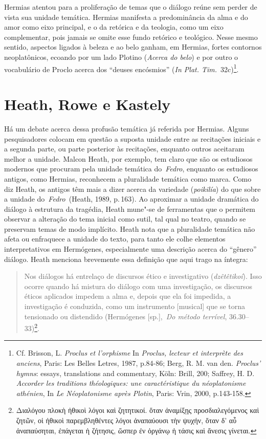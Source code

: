 Hermias atentou para a proliferação de temas que o diálogo reúne sem
perder de vista sua unidade temática. Hermias manifesta a predominância
da alma e do amor como eixo principal, e o da retórica e da teologia,
como um eixo complementar, pois jamais se omite esse fundo retórico e
teológico. Nesse mesmo sentido, aspectos ligados à beleza e ao belo
ganham, em Hermias, fortes contornos neoplatônicos, ecoando por um lado
Plotino (\emph{Acerca do belo}) e por outro o vocabulário de Proclo
acerca dos ``deuses encósmios'' (\emph{In Plat. Tim.}~32c)\footnote{Cf.
  Brisson, L. \emph{Proclus et l'orphisme} In \emph{Proclus, lecteur et
  interprète des anciens}, Paris: Les Belles Letres, 1987, p.84-86;
  Berg, R. M. van den. \emph{Proclus' hymns}: essays, translations and
  commentary, Köln: Brill, 200; Saffrey, H. D. \emph{Accorder les
  traditions théologiques: une caractéristique du néoplatonisme
  athénien}, In \emph{Le Néoplatonisme après Plotin}, Paris: Vrin, 2000,
  p.143-158.}.

 

\section{Heath, Rowe e Kastely}

 

Há um debate acerca dessa profusão temática já referida por Hermias.
Alguns pesquisadores colocam em questão a suposta unidade entre as
recitações iniciais e a segunda parte, ou parte posterior às recitações,
enquanto outros aceitaram melhor a unidade. Malcon Heath, por exemplo,
tem claro que são os estudiosos modernos que procuram pela unidade
temática do~\emph{Fedro}, enquanto os estudiosos antigos, como Hermias,
reconhecem a pluralidade temática como marca. Como diz Heath, os antigos
têm mais a dizer acerca da variedade (\emph{poikilía}) do que sobre a 
unidade do~\emph{Fedro~}(Heath, 1989, p.\,163). Ao aproximar a unidade
dramática do diálogo à estrutura da tragédia, Heath mune"-se de
ferramentas que o permitem observar a alteração do tema inicial como
sutil, tal qual no teatro, quando se preservam temas de modo implícito.
Heath nota que a pluralidade temática não afeta ou enfraquece a unidade
do texto, para tanto ele colhe elementos interpretativos em Hermógenes,
especialmente uma descrição acerca do ``gênero'' diálogo. Heath menciona
brevemente essa definição que aqui trago na íntegra:

 

\begin{quote}
Nos diálogos há entrelaço de discursos ético e investigativo
(\emph{dzêtêtikoí}). Isso ocorre quando há mistura do diálogo com uma
investigação, os discursos éticos aplicados impedem a alma e, depois que
ela foi impedida, a investigação é conduzida, como um instrumento
[musical] que se torna tensionado ou distendido (Hermógenes
[sp.],~\emph{Do método terrível}, 36.30--33)\footnote{Διαλόγου πλοκὴ
  ἠθικοὶ λόγοι καὶ ζητητικοί. ὅταν ἀναμίξῃς προσδιαλεγόμενος καὶ ζητῶν,
  οἱ ἠθικοὶ παρεμβληθέντες λόγοι ἀναπαύουσι τὴν ψυχήν, ὅταν δ' αὖ
  ἀναπαύσηται, ἐπάγεται ἡ ζήτησις, ὥσπερ ἐν ὀργάνῳ ἡ τάσις καὶ ἄνεσις
  γίνεται.}.
\end{quote}

